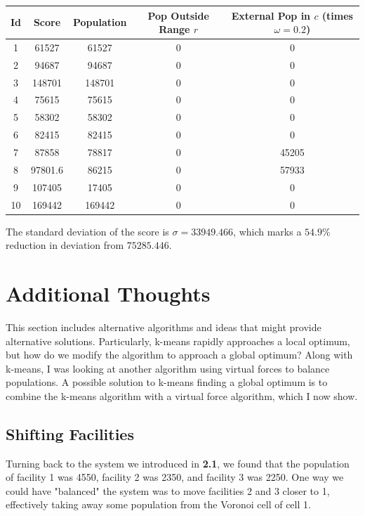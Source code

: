 \documentclass{article}
\begin{document}
\begin{center}
\begin{tabular}{ | c | c | c | c | c | }
 \hline
 Id & Score & Population & Pop Outside Range $r$ & External Pop in $c$ (times $\omega=0.2$)\\
 \hline
 1 & 61527 & 61527 & 0 & 0 \\ 
 2 & 94687 & 94687 & 0 & 0 \\  
 3 & 148701 & 148701 & 0 & 0 \\
 4 & 75615 & 75615 & 0 & 0 \\
 5 & 58302 & 58302 & 0 & 0 \\
 6 & 82415 & 82415 & 0 & 0 \\
 7 & 87858 & 78817 & 0 & 45205 \\
 8 & 97801.6 & 86215 & 0 & 57933 \\
 9 & 107405 & 17405 & 0 & 0 \\
 10 & 169442 & 169442 & 0 & 0 \\
 \hline
\end{tabular}
\end{center}

The standard deviation of the score is $\sigma = \mathbf{33949.466}$, which marks a $\mathbf{54.9\%}$ reduction in deviation from $\mathbf{75285.446}$.

\section{Additional Thoughts}

This section includes alternative algorithms and ideas that might provide alternative solutions. Particularly, k-means rapidly approaches a local optimum, but how do we modify the algorithm to approach a global optimum? Along with k-means, I was looking at another algorithm using virtual forces to balance populations. A possible solution to k-means finding a global optimum is to combine the k-means algorithm with a virtual force algorithm, which I now show.

\subsection{Shifting Facilities}

Turning back to the system we introduced in \textbf{2.1}, we found that the population of facility 1 was 4550, facility 2 was 2350, and facility 3 was 2250. One way we could have "balanced" the system was to move facilities 2 and 3 closer to 1, effectively taking away some population from the Voronoi cell of cell 1.
\end{document}
